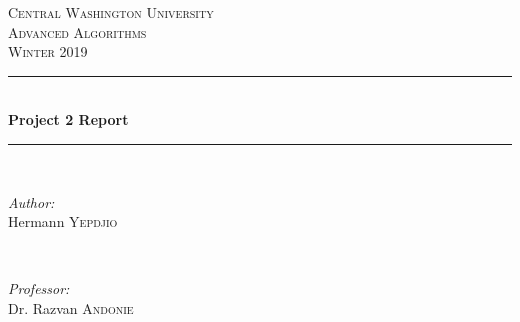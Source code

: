 \documentclass[12pt]{article}
\begin{document}
	
	\begin{titlepage}
		
		\newcommand{\HRule}{\rule{\linewidth}{0.5mm}} %
		
		\center %
		
		
		\textsc{\LARGE Central Washington University}\\[1.5cm] %
		\textsc{\Large Advanced Algorithms}\\[0.5cm] %
		\textsc{\large Winter 2019}\\[0.5cm] %
		
		
		\HRule \\[0.4cm]
		{ \huge \bfseries Project 2 Report}\\[0.4cm] %
		\HRule \\[1.5cm]
		
		
		\begin{minipage}{0.4\textwidth}
			\begin{flushleft} \large
				\emph{Author:}\\
				Hermann \textsc{Yepdjio} %
			\end{flushleft}
		\end{minipage}
		~
		\begin{minipage}{0.4\textwidth}
			\begin{flushright} \large
				\emph{Professor:} \\
				Dr. Razvan \textsc{Andonie} %
			\end{flushright}
		\end{minipage}\\[1cm]
		

\end{titlepage}
\end{document}

